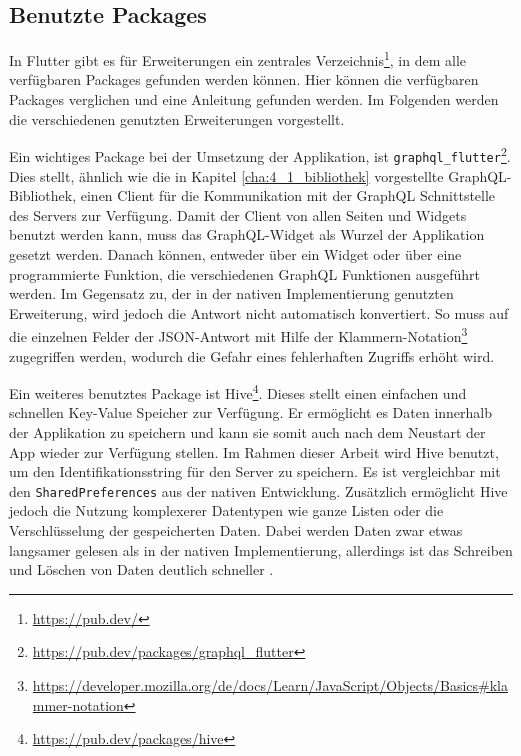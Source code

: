 \subsection{Benutzte Packages}
\label{cha:4_3_2}
In Flutter gibt es für Erweiterungen ein zentrales Verzeichnis\footnote{\url{https://pub.dev/}}, in dem alle verfügbaren Packages gefunden werden können. Hier können die verfügbaren Packages verglichen und eine Anleitung gefunden werden. Im Folgenden werden die verschiedenen genutzten Erweiterungen vorgestellt.

Ein wichtiges Package bei der Umsetzung der Applikation, ist \verb|graphql_flutter|\footnote{\url{https://pub.dev/packages/graphql\_flutter}}. 
Dies stellt, ähnlich wie die in Kapitel \ref{cha:4_1_bibliothek} vorgestellte GraphQL-Bibliothek, einen Client für die Kommunikation mit der GraphQL Schnittstelle des Servers zur Verfügung.
Damit der Client von allen Seiten und Widgets benutzt werden kann, muss das GraphQL-Widget als Wurzel der Applikation gesetzt werden. Danach können, entweder über ein Widget oder über eine programmierte Funktion, die verschiedenen GraphQL Funktionen ausgeführt werden. 
Im Gegensatz zu, der in der nativen Implementierung genutzten Erweiterung, wird jedoch die Antwort nicht automatisch konvertiert. So muss auf die einzelnen Felder der JSON-Antwort mit Hilfe der Klammern-Notation\footnote{\url{https://developer.mozilla.org/de/docs/Learn/JavaScript/Objects/Basics\#klammer-notation}} zugegriffen werden, wodurch die Gefahr eines fehlerhaften Zugriffs erhöht wird.

Ein weiteres benutztes Package ist Hive\footnote{\url{https://pub.dev/packages/hive}}. Dieses stellt einen einfachen und schnellen Key-Value Speicher zur Verfügung. Er ermöglicht es Daten innerhalb der Applikation zu speichern und kann sie somit auch nach dem Neustart der App wieder zur Verfügung stellen. Im Rahmen dieser Arbeit wird Hive benutzt, um den Identifikationsstring für den Server zu speichern. Es ist vergleichbar mit den \verb|SharedPreferences| aus der nativen Entwicklung. Zusätzlich ermöglicht Hive jedoch die Nutzung komplexerer Datentypen wie ganze Listen oder die Verschlüsselung der gespeicherten Daten. Dabei werden Daten zwar etwas langsamer gelesen als in der nativen Implementierung, allerdings ist das Schreiben und Löschen von Daten deutlich schneller \cite{hive_vs_sharedPrefernces}.

